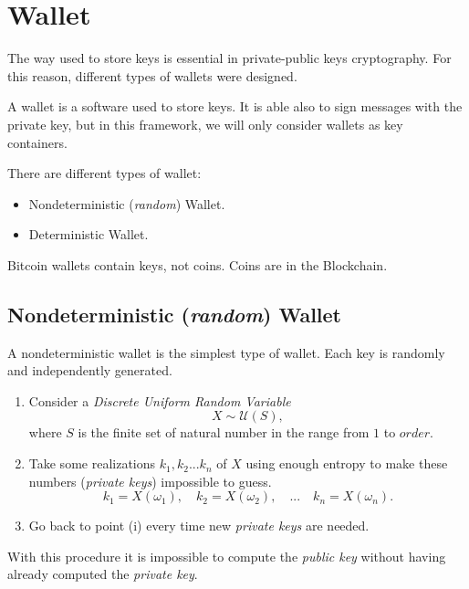 \chapter{Wallet}

\label{wallet}

The way used to store keys is essential in private-public keys cryptography. For this reason, different types of wallets were designed.
\begin{definition}
	A wallet is a software used to store keys. It is able also to sign messages with the private key, but in this framework, we will only consider wallets as key containers. 
\end{definition}
There are different types of wallet:
\begin{itemize}
	\item Nondeterministic (\textit{random}) Wallet.
	\item Deterministic Wallet.
\end{itemize}

\begin{remark}
	Bitcoin wallets contain keys, not coins. Coins are in the Blockchain.
\end{remark}

\section{Nondeterministic (\textit{random}) Wallet}
A nondeterministic wallet is the simplest type of wallet. Each key is randomly and independently generated.

\begin{enumerate}[label=(\roman*)]
	\item Consider a \textit{Discrete Uniform Random Variable}
	\begin{equation*}
	X\sim \mathcal{U}(S),
	\end{equation*}
	where $S$ is the finite set of natural number in the range from $1$ to $order$.
	\item Take some realizations $k_1,k_2...k_n$ of $X$ using enough entropy to make these numbers (\textit{private keys}) impossible to guess.
	\begin{equation*}
	k_1=X(\omega_1), \quad  k_2=X(\omega_2), \quad ... \quad k_n=X(\omega_n).
	\end{equation*}
	\item Go back to point (i) every time new \textit{private keys} are needed.
\end{enumerate}
With this procedure it is impossible to compute the \textit{public key} without having already computed the \textit{private key}.

